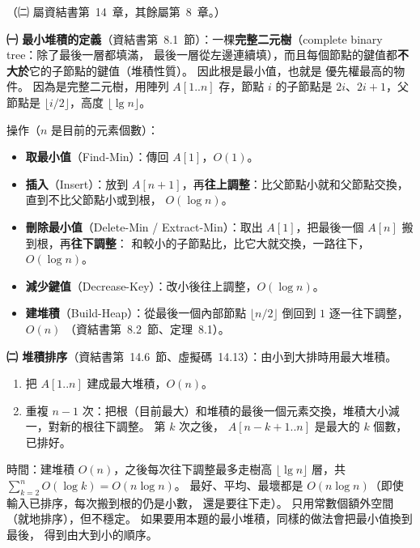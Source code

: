 \begin{pastsoln}
（㈡ 屬資結書第~14~章，其餘屬第~8~章。）

\textbf{㈠ 最小堆積的定義}（資結書第~8.1~節）：一棵\textbf{完整二元樹}（complete binary tree：除了最後一層都填滿，
最後一層從左邊連續填），而且每個節點的鍵值都\textbf{不大於}它的子節點的鍵值（堆積性質）。 因此根是最小值，也就是
優先權最高的物件。 因為是完整二元樹，用陣列 $A[1..n]$ 存，節點 $i$ 的子節點是 $2i$、$2i + 1$，父節點是
$\lfloor i/2 \rfloor$，高度 $\lfloor \lg n \rfloor$。

操作（$n$ 是目前的元素個數）：
\begin{itemize}
\item \textbf{取最小值}（Find-Min）：傳回 $A[1]$，$O(1)$。
\item \textbf{插入}（Insert）：放到 $A[n+1]$，再\textbf{往上調整}：比父節點小就和父節點交換，直到不比父節點小或到根，
$O(\log n)$。
\item \textbf{刪除最小值}（Delete-Min / Extract-Min）：取出 $A[1]$，把最後一個 $A[n]$ 搬到根，再\textbf{往下調整}：
和較小的子節點比，比它大就交換，一路往下，$O(\log n)$。
\item \textbf{減少鍵值}（Decrease-Key）：改小後往上調整，$O(\log n)$。
\item \textbf{建堆積}（Build-Heap）：從最後一個內部節點 $\lfloor n/2 \rfloor$ 倒回到 $1$ 逐一往下調整，$O(n)$
（資結書第~8.2~節、定理~8.1）。
\end{itemize}

\textbf{㈡ 堆積排序}（資結書第~14.6~節、虛擬碼~14.13）：由小到大排時用最大堆積。
\begin{enumerate}
\item 把 $A[1..n]$ 建成最大堆積，$O(n)$。
\item 重複 $n - 1$ 次：把根（目前最大）和堆積的最後一個元素交換，堆積大小減一，對新的根往下調整。 第 $k$ 次之後，
$A[n-k+1..n]$ 是最大的 $k$ 個數，已排好。
\end{enumerate}
時間：建堆積 $O(n)$，之後每次往下調整最多走樹高 $\lfloor \lg n \rfloor$ 層，共
$\sum_{k=2}^{n} O(\log k) = O(n \log n)$。 最好、平均、最壞都是 $O(n \log n)$（即使輸入已排序，每次搬到根的仍是小數，
還是要往下走）。 只用常數個額外空間（就地排序），但不穩定。 如果要用本題的最小堆積，同樣的做法會把最小值換到最後，
得到由大到小的順序。


\end{pastsoln}
